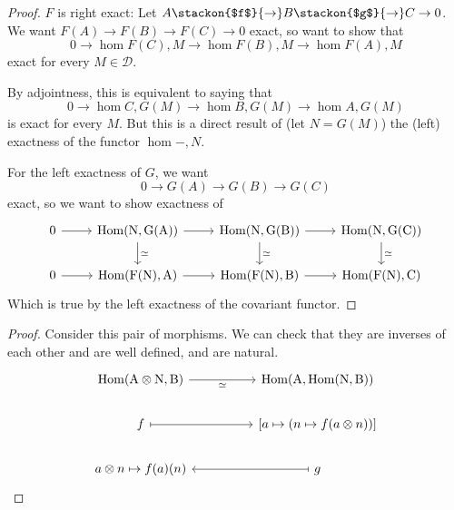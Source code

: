 \begin{proof}
    $F$ is right exact:
    Let $A\stackon{$f$}{\to} B \stackon{$g$}{\to} C\to 0$. We want $F(A)\to F(B)\to F(C)\to 0$ exact, so want to show that \[
   0 \to \hom{F(C),M}\to \hom{F(B),M}\to \hom{F(A),M}    \]
    exact for every $M\in \mathcal{D}.$

    By adjointness, this is equivalent to saying that 
    \[
    0 \to \hom{C,G(M)}\to \hom{B,G(M)}\to \hom{A,G(M)}  \] is exact for every $M$. But this is a direct result of (let $N=G(M)$) the (left) exactness of the functor $\hom{-,N}$.

    For the left exactness of $G$, we want \[
    0\to G(A)\to G(B)\to G(C)
    \] exact, so we want to show exactness of \[\begin{tikzcd}
	0 & {\rm{Hom}(N,G(A))} & {\rm{Hom}(N,G(B))} & {\rm{Hom}(N,G(C))} \\
	0 & {\rm{Hom}(F(N),A)} & {\rm{Hom}(F(N),B)} & {\rm{Hom}(F(N),C)}
	\arrow[from=1-1, to=1-2]
	\arrow[from=1-2, to=1-3]
	\arrow["\simeq", from=1-2, to=2-2]
	\arrow[from=1-3, to=1-4]
	\arrow["\simeq", from=1-3, to=2-3]
	\arrow["\simeq", from=1-4, to=2-4]
	\arrow[from=2-1, to=2-2]
	\arrow[from=2-2, to=2-3]
	\arrow[from=2-3, to=2-4]
\end{tikzcd}\]
Which is true by the left exactness of the covariant functor.
\end{proof}

\begin{proof}
    Consider this pair of morphisms. We can check that they are inverses of each other and are well defined, and are natural.
    \[\begin{tikzcd}
	{\rm{Hom}(A\otimes N,B)} && {\rm{Hom}(A,\rm{Hom}(N,B))} \\
	f && {[a\mapsto (n\mapsto f(a\otimes n))]} \\
	{a\otimes n\mapsto f(a)(n)} && g
	\arrow["\simeq"', from=1-1, to=1-3]
	\arrow[maps to, from=2-1, to=2-3]
	\arrow[maps to, from=3-3, to=3-1]
\end{tikzcd}\]
\end{proof}
